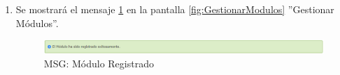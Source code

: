 \begin{enumerate}
			\item Se mostrará el mensaje \ref{fig:moduloRegistrado} en la pantalla \ref{fig:GestionarModulos} ''Gestionar Módulos''.
			
			\begin{figure}[htbp!]
				\begin{center}
					\includegraphics[scale=0.6]{roles/lider/modulos/pantallas/IU5-1MSG1}
					\caption{MSG: Módulo Registrado}
					\label{fig:moduloRegistrado}
				\end{center}
			\end{figure}
			\end{enumerate}